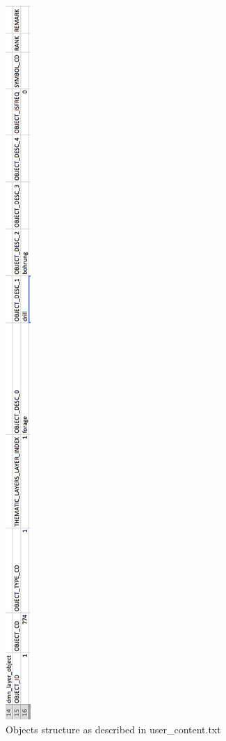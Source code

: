 \documentclass[a4paper, 12pt]{article}
\begin{document}
\begin{figure} [hbp]
	\centering
    \includegraphics[height=.9\textheight]{img/objects.png}
    \caption{Objects structure as described in user\_content.txt}
    \label{fig:objects}
\end{figure}
\end{document}
